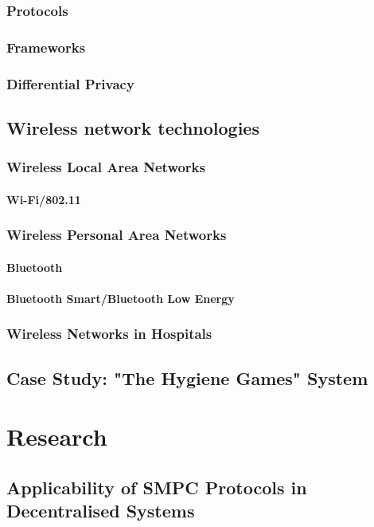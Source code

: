 	\subsection*{Protocols}
	\subsection*{Frameworks}
	\subsection*{Differential Privacy}
	\section{Wireless network technologies}
	\subsection*{Wireless Local Area Networks}
	\subsubsection*{Wi-Fi/802.11}
	\subsection*{Wireless Personal Area Networks}
	\subsubsection*{Bluetooth}
	\subsubsection*{Bluetooth Smart/Bluetooth Low Energy}
	\subsection*{Wireless Networks in Hospitals}
	\section{Case Study: "The Hygiene Games" System}

\chapter{Research}
	\section{Applicability of SMPC Protocols in Decentralised Systems}
	
